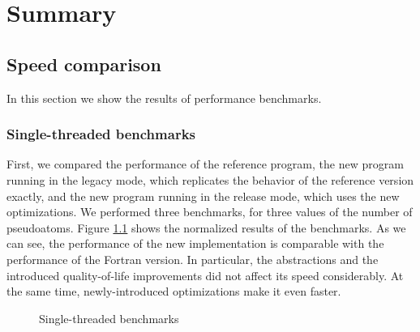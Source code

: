 \chapter{Summary}\label{c:summary}

\section{Speed comparison}\label{summary:speed}


In this section we show the results of performance benchmarks.

\subsection{Single-threaded benchmarks}

First, we compared the performance of the reference program, the new program running in the legacy mode, which replicates the behavior of the reference version exactly, and the new program running in the release mode, which uses the new optimizations. We performed three benchmarks, for three values of the number of pseudoatoms. Figure \ref{f:bench_single} shows the normalized results of the benchmarks. As we can see, the performance of the new implementation is comparable with the performance of the Fortran version. In particular, the abstractions and the introduced quality-of-life improvements did not affect its speed considerably. At the same time, newly-introduced optimizations make it even faster.

\begin{figure}[ht]
\centering
{}
\caption{Single-threaded benchmarks}
\label{f:bench_single}
\end{figure}

